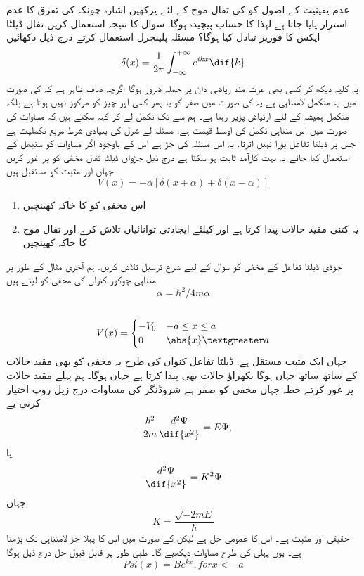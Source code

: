  عدم یقینیت کے اصول کو کی تفال موج کے لئے پرکھیں اشارہ چونکہ  کی تفرق کا عدم استرار پایا جاتا ہے لہذا  کا حساب پیچیدہ ہوگا. 
 سوال کا نتیجہ استعمال کریں 
 تفال ڈیلٹا ایکس  کا فوریر تبادل کیا ہوگا؟ مسئلہ پلینچرل استعمال کرتے درج ذیل دکھائیں 
\[\delta(x)=\frac{1}{2\pi}\int_{-\infty}^{+\infty} e^{ikx} \dif{k}\]
 یہ کلیہ دیکھ کر کسی بھی عزت مند ریاضی دان پر حملہ ضرور ہوگا اگرچہ صاف ظاہر ہے کہ کی صورت میں یہ متکمل  لامتناہی ہے یہ کی صورت میں صفر کو یا پھر کسی اور چیز کو مرکوز نہیں ہوتا ہے بلکہ متکمل ہمیشہ کے لئے ارتیاش پزیر رہتا ہے۔ 
 ہم  سے  تک تکمل لے کر کہہ سکتے ہیں کہ مساوات  کی صورت میں اس متناہی تکمل کی اوسط قیمت ہے. مسئلہ لے شرل کی بنیادی شرط مربع تکملیت ہے جس پر ڈیلٹا تفاعل پورا نہیں اترتا.  یہ اس مسئلہ کی جڑ ہے اس کے باوجود اگر مساوات   کو سنبھل کے استعمال کیا جائے یہ بہت کارآمد ثابت ہو سکتا ہے
درج ذیل جڑواں ڈیلٹا تفال مخفی کو پر غور کریں جہاں  اور   مثبت کو مستقبل ہیں
\[V(x)=-\alpha[\delta(x+\alpha)+\delta(x-\alpha)]\]
\begin{enumerate}
\item اس مخفی کو کا خاکہ کھینچیں
\item  یہ کتنی مقید حالات پیدا کرتا ہے اور کیلئے ایجادتی توانائیاں تلاش کرے اور تفال موج کا خاکہ کھینچیں
\end{enumerate}
جوڈی ڈیلٹا تفاعل کے مخفی کو سوال کے لیے شرع ترسیل تلاش کریں. 
 ہم آخری مثال کے طور پر متناہی چوکور کنواں کی مخفی کو لیتے ہیں 
\[\alpha=\hbar^{2}/4m\alpha\]\\
\[ V(x)= \begin{cases} 
     -V_{0} & -a\le x\le a \\
      0 & \abs{x}\textgreater a
   \end{cases}
\]
جہاں ایک مثبت مستقل ہے. 
 ڈیلٹا تفاعل کنواں کی طرح یہ مخفی کو بھی مقید حالات کے ساتھ ساتھ جہاں  ہوگا بکھراؤ حالات بھی پیدا  کرتا ہے جہاں ہوگا۔
ہم پہلے مقید حالات پر غور کرتے 
 خطہ  جہاں مخفی کو صفر ہے شروڈنگر کی مساوات درج زیل روپ اختیار کرتی یے
\[-\frac{\hbar^{2}}{2m} \frac{d^{2} \Psi}{\dif{x^{2}}}=E\Psi,\] 
یا
 \[ \frac{d^{2}\Psi}{\dif{x^{2}}}=K^{2}\Psi\]
جہاں \[K=\frac{\sqrt{-2mE}}{\hbar}\] حقیقی اور مثبت ہے۔  اس کا عمومی حل  ہے لیکن           کے صورت میں اس کا پہلا جز لامتناہی تک بڑھتا ہے۔ 
 یوں پہلی کی طرح مساوات دیکھیے گا۔
 طبی طور پر قابل قبول حل درج ذیل ہوگا
\[ Psi(x)=Be^{kx}, for x<-a\]

